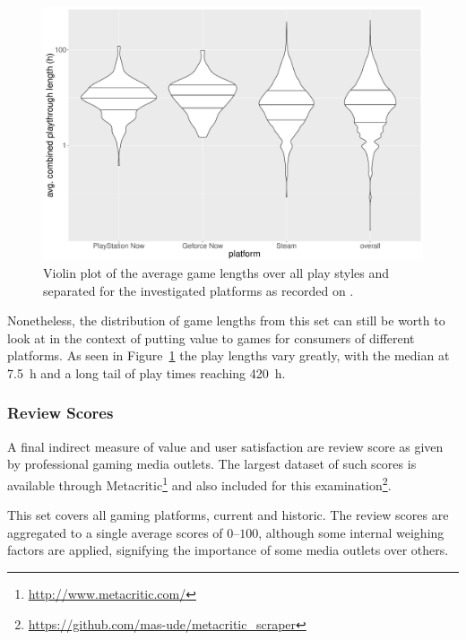 \begin{figure}[!t]
	\centering
	\includegraphics[width=1.0\columnwidth]{images/gamelengths-by-platform-violin.pdf}
	\caption{Violin plot of the average game lengths over all play styles and separated for the investigated platforms as recorded on \hltb.}
\label{fig:gamelengths-violin}
\end{figure}

Nonetheless, the distribution of game lengths from this set can still be worth to look at in the context of putting value to games for consumers of different platforms. As seen in Figure~\ref{fig:gamelengths-violin} the play lengths vary greatly, with the median at \SI{7.5}{\hour} and a long tail of play times reaching \SI{420}{\hour}.



\subsubsection{Review Scores}

A final indirect measure of value and user satisfaction are review score as given by professional gaming media outlets. The largest dataset of such scores is available through Metacritic\footnote{\url{http://www.metacritic.com/}} and also included for this examination\footnote{\url{https://github.com/mas-ude/metacritic_scraper}}.

This set covers all gaming platforms, current and historic. The review scores are aggregated to a single average scores of $0$--$100$, although some internal weighing factors are applied, signifying the importance of some media outlets over others.

